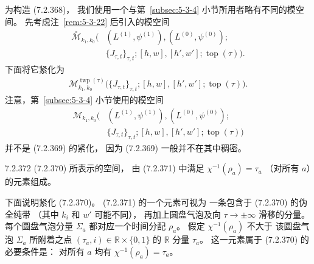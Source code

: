 为构造 (7.2.368)，
我们使用一个与第~\ref{subsec:5-3-4}
小节所用者略有不同的模空间。
先考虑注~\ref{rem:5-3-22} 后引入的模空间
\begin{equation}
\begin{aligned}
\overset{\circ}{\mathcal M}_{k_1,k_0}\bigl(
&(L^{(1)},\psi^{(1)}),
(L^{(0)},\psi^{(0)});\\
&\{J_{\tau,t}\}_{\tau,t};
[h,w],[h',w'];\operatorname{top}(\tau)
\bigr).
\end{aligned}
\tag{7.2.369}\label{eq:7-2-369}
\end{equation}
下面将它紧化为
\begin{equation}
\begin{aligned}
\mathcal M^{\operatorname{twp}(\tau)}_{k_1,k_0}
\bigl(\{J_{\tau,t}\}_{\tau,t};
[h,w],[h',w'];\operatorname{top}(\tau)\bigr).
\end{aligned}
\tag{7.2.370}\label{eq:7-2-370}
\end{equation}
注意，第~\ref{subsec:5-3-4} 小节使用的模空间
\begin{equation}
\begin{aligned}
\mathcal M_{k_1,k_0}\bigl(
&(L^{(1)},\psi^{(1)}),
(L^{(0)},\psi^{(0)});\\
&\{J_{\tau,t}\}_{\tau,t};
[h,w],[h',w'];\operatorname{top}(\tau)
\bigr)
\end{aligned}
\tag{7.2.371}\label{eq:7-2-371}
\end{equation}
并不是 (7.2.369) 的紧化，
因为 (7.2.369) 一般并不在其中稠密。

\begin{definition}{7.2.372}\label{def:7-2-372}
(7.2.370) 所表示的空间，
由 (7.2.371) 中满足
$\chi^{-1}(\rho_a)=\tau_a$
（对所有 $a$）的元素组成。
\end{definition}

下面说明紧化 (7.2.370)。
(7.2.371) 的一个元素可视为
一条包含于 (7.2.370) 的伪全纯带
（其中 $k_i$ 和 $w'$ 可能不同），
再加上圆盘气泡及向 $\tau\to\pm\infty$
滑移的分量。
每个圆盘气泡分量 $\Sigma_a$
都对应一个时间分配 $\rho_a$。
假定 $\chi^{-1}(\rho_a)$ 不大于
该圆盘气泡 $\Sigma_a$ 所附着之点
$(\tau_a,i)\in\mathbb R\times\{0,1\}$
的 $\mathbb R$ 分量 $\tau_a$。
这一元素属于 (7.2.370) 的必要条件是：
对所有 $a$ 均有
$\chi^{-1}(\rho_a)=\tau_a$。
